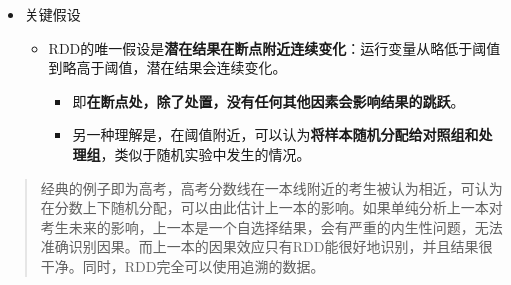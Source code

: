 \documentclass[11pt,a4paper]{ctexart}
\begin{document}
\begin{itemize}
\item
  关键假设

  \begin{itemize}
  \item
    RDD的唯一假设是\textbf{潜在结果在断点附近连续变化}：运行变量从略低于阈值到略高于阈值，潜在结果会连续变化。

    \begin{itemize}
    \item
      即\textbf{在断点处，除了处置，没有任何其他因素会影响结果的跳跃}。
    \item
      另一种理解是，在阈值附近，可以认为\textbf{将样本随机分配给对照组和处理组}，类似于随机实验中发生的情况。
    \end{itemize}
  \end{itemize}
\end{itemize}

\begin{quote}
经典的例子即为高考，高考分数线在一本线附近的考生被认为相近，可认为在分数上下随机分配，可以由此估计上一本的影响。如果单纯分析上一本对考生未来的影响，上一本是一个自选择结果，会有严重的内生性问题，无法准确识别因果。而上一本的因果效应只有RDD能很好地识别，并且结果很干净。同时，RDD完全可以使用追溯的数据。
\end{quote}
\end{document}

